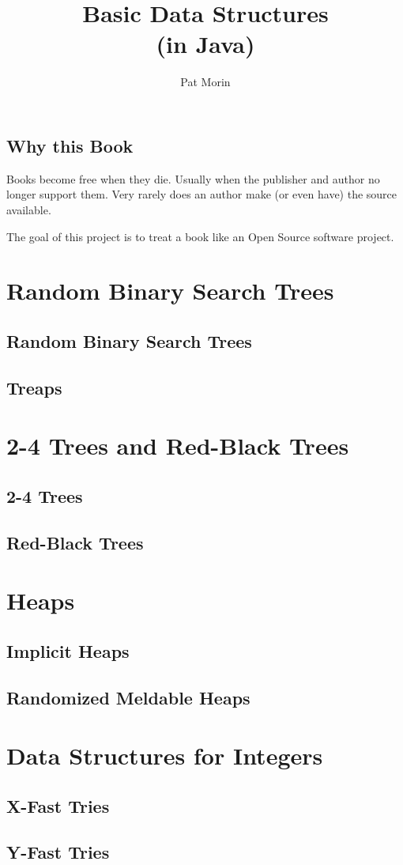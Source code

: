 \documentclass{book}
\title{Basic Data Structures\\(in Java)}
\author{Pat Morin}
\begin{document}
\begin{titlepage}
\maketitle
\thispagestyle{empty}
\end{titlepage}

\tableofcontents

\section*{Why this Book}

Books become free when they die.  Usually when the publisher and author
no longer support them.  Very rarely does an author make (or even have)
the source available.

The goal of this project is to treat a book like an Open Source software
project.








\chapter{Random Binary Search Trees}
\section{Random Binary Search Trees}
\section{Treaps}

\chapter{2-4 Trees and Red-Black Trees}
\section{2-4 Trees}
\section{Red-Black Trees}

\chapter{Heaps}
\section{Implicit Heaps}
\section{Randomized Meldable Heaps}

\chapter{Data Structures for Integers}
\section{X-Fast Tries}
\section{Y-Fast Tries}
\end{document}
